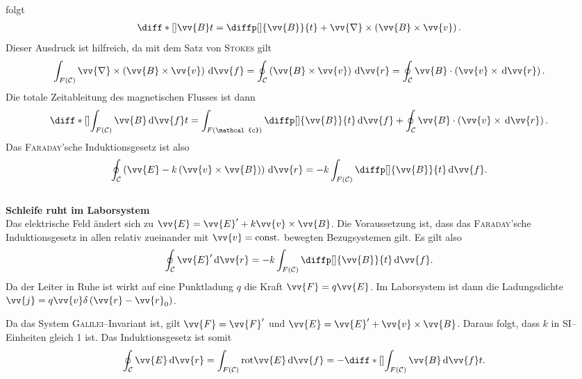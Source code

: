 \documentclass[a4paper,12pt]{article}
\newcommand{\td}{\,\text{d}}
\numberwithin{equation}{section}
\begin{document}
folgt
\begin{align} 
        \diff*[]{\vv{B}}{t}&=\diffp[]{\vv{B}}{t}+\vv{\nabla }\times \left(\vv{B}\times \vv{v}\right)
.\end{align} 
Dieser Ausdruck ist hilfreich, da mit dem Satz von \textsc{Stokes} gilt
\begin{align} 
        \int_{F\left(\mathcal{C}\right)}^{}\vv{\nabla }\times \left(\vv{B}\times \vv{v}\right)\td \vv{f}&=\oint_{\mathcal{C}}^{}\left(\vv{B}\times \vv{v}\right)\td \vv{r}=\oint_{\mathcal{C}}^{}\vv{B}\cdot \left(\vv{v}\times \td \vv{r}\right)
.\end{align} 
Die totale Zeitableitung des magnetischen Flusses ist dann
\begin{align} 
        \diff*[]{\int_{F\left(\mathcal{C}\right)}^{}\vv{B}\td \vv{f}}{t}&=\int_{F\left(\mathcal{c}\right)}^{}\diffp[]{\vv{B}}{t}\td \vv{f}+\oint_{\mathcal{C}}^{}\vv{B}\cdot \left(\vv{v}\times \td \vv{r}\right)
.\end{align} 
Das \textsc{Faraday}'sche Induktionsgesetz ist also
\begin{align} 
        \oint_{\mathcal{C}}^{}\left(\vv{E}-k\left(\vv{v}\times \vv{B}\right)\right)\td \vv{r}&=-k\int_{F\left(\mathcal{C}\right)}^{}\diffp[]{\vv{B}}{t}\td \vv{f}
.\end{align} 
\hfill\\\textbf{Schleife ruht im Laborsystem}\\ 
Das elektrische Feld ändert sich zu $\vv{E}=\vv{E}'+k\vv{v}\times \vv{B}$. 
Die Voraussetzung ist, dass das \textsc{Faraday}'sche Induktionsgesetz in allen relativ zueinander mit $\vv{v}=\text{const.}$ bewegten Bezugsystemen gilt. 
Es gilt also
\begin{align} 
        \oint_{\mathcal{C}}^{}\vv{E}'\td \vv{r}&=-k\int_{F\left(\mathcal{C}\right)}^{}\diffp[]{\vv{B}}{t}\td \vv{f}
.\end{align} 
Da der Leiter in Ruhe ist wirkt auf eine Punktladung $q$ die Kraft $\vv{F}=q\vv{E}$. 
Im Laborsystem ist dann die Ladungsdichte $\vv{j}=q\vv{v}\delta \left(\vv{r}-\vv{r}_0\right)$.\par
Da das System \textsc{Galilei}--Invariant ist, gilt $\vv{F}=\vv{F}'$ und $\vv{E}=\vv{E}'+\vv{v}\times \vv{B}$. 
Daraus folgt, dass $k$ in SI--Einheiten gleich 1 ist.
Das Induktionsgesetz ist somit
\begin{align} 
        \oint_{\mathcal{C}}^{}\vv{E}\td \vv{r}=\int_{F\left(\mathcal{C}\right)}^{}\text{rot}\vv{E}\td \vv{f}=-\diff*[]{\int_{F\left(\mathcal{C}\right)}^{}\vv{B}\td \vv{f}}{t}
.\end{align} 
\end{document}
